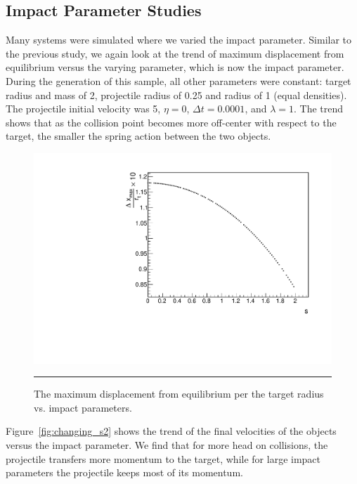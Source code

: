 \documentclass[aps,prl,floatfix,preprint,nofootinbib]{revtex4}
\begin{document}
\subsection{Impact Parameter Studies}
Many systems were simulated where we varied the impact parameter. Similar to the previous study, we again look at the trend of maximum displacement from equilibrium versus the varying parameter, which is now the impact parameter. During the generation of this sample, all other parameters were constant: target radius and mass of 2, projectile radius of 0.25 and radius of 1 (equal densities). The projectile initial velocity was 5, $\eta = 0$, $\Delta t = 0.0001$, and $\lambda = 1$. The trend shows that as the collision point becomes more off-center with respect to the target, the smaller the spring action between the two objects.
\begin{figure}[h!]
  \includegraphics[width=.45\linewidth]{plots/trend_plots/Eloss_vs_s.pdf}
                  {\par\nobreak\rule[9pt]{35em}{0.5pt}\vspace{-5mm}}
                  \caption{The maximum displacement from equilibrium per the target radius vs. impact parameters.}
                  \label{fig:changing_s1}  
\end{figure}
Figure~\ref{fig:changing_s2} shows the trend of the final velocities of the objects versus the impact parameter. We find that for more head on collisions, the projectile transfers more momentum to the target, while for large impact parameters the projectile keeps most of its momentum.
\end{document}
